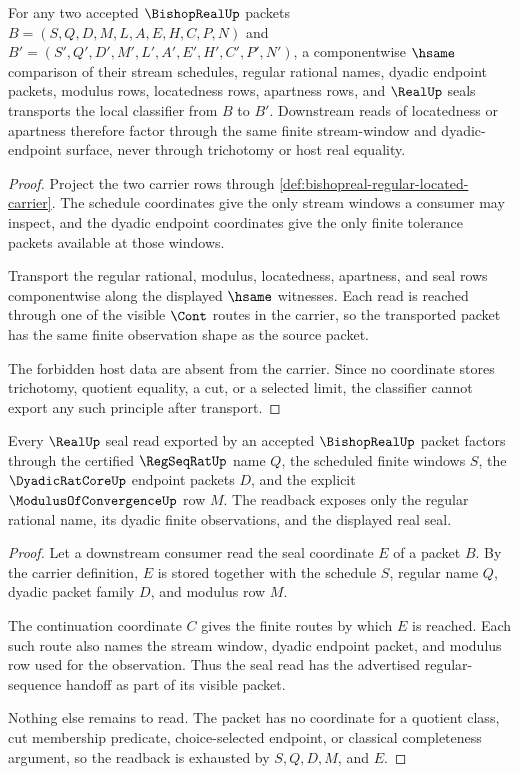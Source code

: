 \begin{theorem}
\label{thm:bishopreal-located-apartness-transport}
For any two accepted $\BishopRealUp$ packets
$B=(S,Q,D,M,L,A,E,H,C,P,N)$ and $B'=(S',Q',D',M',L',A',E',H',C',P',N')$, a
componentwise $\hsame$ comparison of their stream schedules, regular rational
names, dyadic endpoint packets, modulus rows, locatedness rows, apartness rows,
and $\RealUp$ seals transports the local classifier from $B$ to $B'$.
Downstream reads of locatedness or apartness therefore factor through the same
finite stream-window and dyadic-endpoint surface, never through trichotomy or
host real equality.
\end{theorem}
\begin{proof}
Project the two carrier rows through
\autoref{def:bishopreal-regular-located-carrier}. The schedule coordinates give
the only stream windows a consumer may inspect, and the dyadic endpoint
coordinates give the only finite tolerance packets available at those windows.

Transport the regular rational, modulus, locatedness, apartness, and seal rows
componentwise along the displayed $\hsame$ witnesses. Each read is reached
through one of the visible $\Cont$ routes in the carrier, so the transported
packet has the same finite observation shape as the source packet.

The forbidden host data are absent from the carrier. Since no coordinate stores
trichotomy, quotient equality, a cut, or a selected limit, the classifier cannot
export any such principle after transport.
\end{proof}

\begin{theorem}
\label{thm:bishopreal-regseqrat-readback}
Every $\RealUp$ seal read exported by an accepted $\BishopRealUp$ packet factors
through the certified $\RegSeqRatUp$ name $Q$, the scheduled finite windows $S$,
the $\DyadicRatCoreUp$ endpoint packets $D$, and the explicit
$\ModulusOfConvergenceUp$ row $M$. The readback exposes only the regular
rational name, its dyadic finite observations, and the displayed real seal.
\end{theorem}
\begin{proof}
Let a downstream consumer read the seal coordinate $E$ of a packet $B$. By the
carrier definition, $E$ is stored together with the schedule $S$, regular name
$Q$, dyadic packet family $D$, and modulus row $M$.

The continuation coordinate $C$ gives the finite routes by which $E$ is reached.
Each such route also names the stream window, dyadic endpoint packet, and
modulus row used for the observation. Thus the seal read has the advertised
regular-sequence handoff as part of its visible packet.

Nothing else remains to read. The packet has no coordinate for a quotient class,
cut membership predicate, choice-selected endpoint, or classical completeness
argument, so the readback is exhausted by $S,Q,D,M$, and $E$.
\end{proof}

